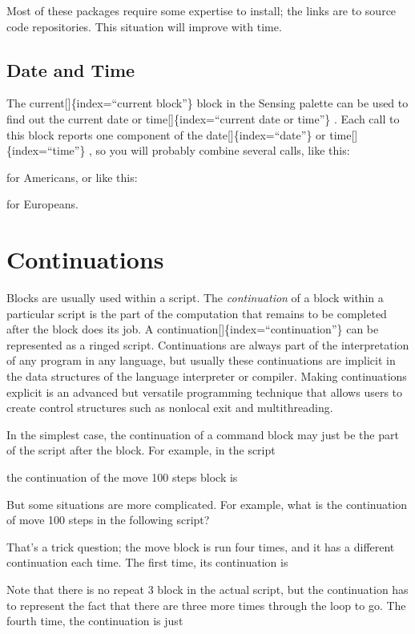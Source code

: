 \documentclass[
  letterpaper,
]{book}
\begin{document}
Most of these packages require some expertise to install; the links are
to source code repositories. This situation will improve with time.

\section{Date and Time}\label{date-and-time}

The current{[}{]}\{index=``current block''\} block in the Sensing
palette can be used to find out the current date or
time{[}{]}\{index=``current date or time''\} . Each call to this block
reports one component of the date{[}{]}\{index=``date''\} or
time{[}{]}\{index=``time''\} , so you will probably combine several
calls, like this:

for Americans, or like this:

for Europeans.


\chapter{Continuations}\label{continuations}

Blocks are usually used within a script. The \emph{continuation} of a
block within a particular script is the part of the computation that
remains to be completed after the block does its job. A
continuation{[}{]}\{index=``continuation''\} can be represented as a
ringed script. Continuations are always part of the interpretation of
any program in any language, but usually these continuations are
implicit in the data structures of the language interpreter or compiler.
Making continuations explicit is an advanced but versatile programming
technique that allows users to create control structures such as
nonlocal exit and multithreading.

In the simplest case, the continuation of a command block may just be
the part of the script after the block. For example, in the script

the continuation of the move 100 steps block is

But some situations are more complicated. For example, what is the
continuation of move 100 steps in the following script?

That's a trick question; the move block is run four times, and it has a
different continuation each time. The first time, its continuation is

Note that there is no repeat 3 block in the actual script, but the
continuation has to represent the fact that there are three more times
through the loop to go. The fourth time, the continuation is just
\end{document}
